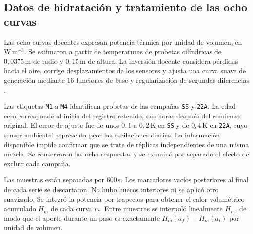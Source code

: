 \subsection{Datos de hidratación y tratamiento de las ocho curvas}
\label{sec:Hidratación y curvas}
Las ocho curvas docentes expresan potencia térmica por unidad de volumen, en $\mathrm{W\,m^{-3}}$. Se estimaron a partir de temperaturas de probetas cilíndricas de $0{,}0375\,\mathrm m$ de radio y $0{,}15\,\mathrm m$ de altura. La inversión docente considera pérdidas hacia el aire, corrige desplazamientos de los sensores y ajusta una curva suave de generación mediante $16$ funciones de base y regularización de segundas diferencias \citep{fuentesDocentes}.

Las etiquetas \texttt{M1} a \texttt{M4} identifican probetas de las campañas \texttt{SS} y \texttt{22A}. La edad cero corresponde al inicio del registro retenido, dos horas después del comienzo original. El error de ajuste fue de unos $0{,}1$ a $0{,}2\,\mathrm K$ en \texttt{SS} y de $0{,}4\,\mathrm K$ en \texttt{22A}, cuyo sensor ambiental representa peor las oscilaciones diarias. La información disponible impide confirmar que se trate de réplicas independientes de una misma mezcla. Se conservaron las ocho respuestas y se examinó por separado el efecto de excluir cada campaña.

Las muestras están separadas por $600\,\mathrm s$. Los marcadores vacíos posteriores al final de cada serie se descartaron. No hubo huecos interiores ni se aplicó otro suavizado. Se integró la potencia por trapecios para obtener el calor volumétrico acumulado $H_m$ de cada curva $m$. Entre muestras se interpoló linealmente $H_m$, de modo que el aporte durante un paso es exactamente $H_m(a_f)-H_m(a_i)$ por unidad de volumen.

